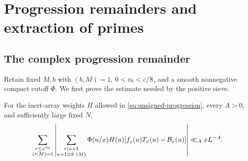 \section{Progression remainders and extraction of primes}\label{sec:extraction}

\subsection{The complex progression remainder}

Retain fixed $M,b$ with $(b,M)=1$, $0<c_0<\varepsilon/8$, and a smooth
nonnegative compact cutoff $\Phi$. We first prove the estimate needed
by the positive sieve.

\begin{proposition}\label{prop:complexremainder}
For the inert-array weights $H$ allowed in
\eqref{eq:unsigned-progression}, every $A>0$, and sufficiently large
fixed $N$,
\begin{equation}\label{eq:complexremainder}
 \sum_{\substack{r\leq x^{c_0}\\(r,M)=1}}
 \left|\sum_{\substack{r\mid u+1\\u+1\equiv b\ (M)}}
    \Phi(u/x)H(u)[f_z(u)T_x(u)-\mathcal B_x(u)]\right|
 \ll_A xL^{-A}.
\end{equation}
\end{proposition}

